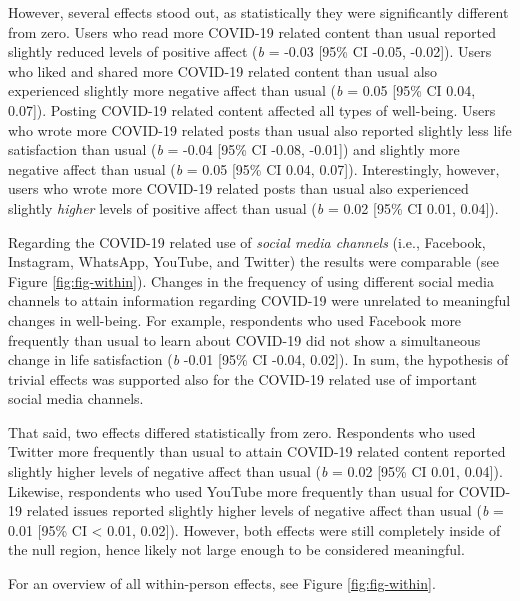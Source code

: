 \documentclass[
  man,mask,floatsintext]{apa7}
\begin{document}
However, several effects stood out, as statistically they were significantly different from zero.
Users who read more COVID-19 related content than usual reported slightly reduced levels of positive affect (\emph{b} = -0.03 {[}95\% CI -0.05, -0.02{]}).
Users who liked and shared more COVID-19 related content than usual also experienced slightly more negative affect than usual (\emph{b} = 0.05 {[}95\% CI 0.04, 0.07{]}).
Posting COVID-19 related content affected all types of well-being.
Users who wrote more COVID-19 related posts than usual also reported slightly less life satisfaction than usual (\emph{b} = -0.04 {[}95\% CI -0.08, -0.01{]}) and slightly more negative affect than usual (\emph{b} = 0.05 {[}95\% CI 0.04, 0.07{]}).
Interestingly, however, users who wrote more COVID-19 related posts than usual also experienced slightly \emph{higher} levels of positive affect than usual (\emph{b} = 0.02 {[}95\% CI 0.01, 0.04{]}).

Regarding the COVID-19 related use of \emph{social media channels} (i.e., Facebook, Instagram, WhatsApp, YouTube, and Twitter) the results were comparable (see Figure \ref{fig:fig-within}).
Changes in the frequency of using different social media channels to attain information regarding COVID-19 were unrelated to meaningful changes in well-being.
For example, respondents who used Facebook more frequently than usual to learn about COVID-19 did not show a simultaneous change in life satisfaction (\emph{b} -0.01 {[}95\% CI -0.04, 0.02{]}).
In sum, the hypothesis of trivial effects was supported also for the COVID-19 related use of important social media channels.

That said, two effects differed statistically from zero.
Respondents who used Twitter more frequently than usual to attain COVID-19 related content reported slightly higher levels of negative affect than usual (\emph{b} = 0.02 {[}95\% CI 0.01, 0.04{]}).
Likewise, respondents who used YouTube more frequently than usual for COVID-19 related issues reported slightly higher levels of negative affect than usual (\emph{b} = 0.01 {[}95\% CI \textless{} 0.01, 0.02{]}).
However, both effects were still completely inside of the null region, hence likely not large enough to be considered meaningful.

For an overview of all within-person effects, see Figure \ref{fig:fig-within}.
\end{document}

